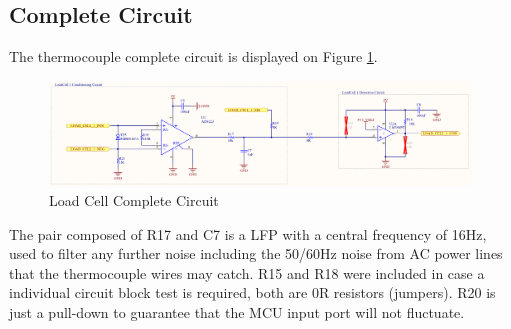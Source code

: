 	\subsection{Complete Circuit}\label{ssec:load-cell-complete-circuit}
		The thermocouple complete circuit is displayed on Figure \ref{fig:load-cell-complete-circuit}.

		\begin{figure}[htbp]
			\centering
				\includegraphics[scale=0.4]{figuras/fig-load-cell-complete-circuit}
			\caption{Load Cell Complete Circuit \cite{load-cell-complete-circuit}}
			\label{fig:load-cell-complete-circuit}
		\end{figure}		

		The pair composed of R17 and C7 is a LFP with a central frequency of 16Hz, used to filter any further noise including the 50/60Hz noise from AC power lines that the thermocouple wires may catch. R15 and R18 were included in case a individual circuit block test is required, both are 0R resistors (jumpers). R20 is just a pull-down to guarantee that the MCU input port will not fluctuate.	
